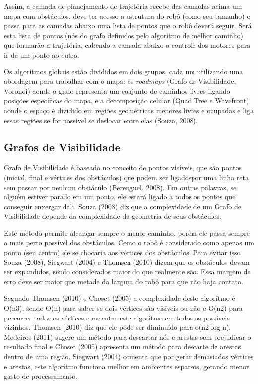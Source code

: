 Assim, a camada de planejamento de trajetória recebe das camadas acima um mapa com obstáculos, deve ter acesso a estrutura do robô (como seu tamanho) e passa para as camadas abaixo uma lista de pontos que o robô deverá seguir. Será esta lista de pontos (nós do grafo definidos pelo algoritmo de melhor caminho) que formarão a trajetória, cabendo a camada abaixo o controle dos motores para ir de um ponto ao outro.

Os algoritmos globais estão divididos em dois grupos, cada um utilizando uma abordagem para trabalhar com o mapa: os \textit{roadmaps} (Grafo de Visibilidade, Voronoi) aonde o grafo representa um conjunto de caminhos livres ligando posições específicas do mapa, e a decomposição celular (Quad Tree e Wavefront) aonde o espaço é dividido em regiões geométricas menores livres e ocupadas e liga essas regiões se for possível se deslocar entre elas (Souza, 2008).

\subsection{Grafos de Visibilidade}

Grafo de Visibilidade é baseado no conceito de pontos visíveis, que são pontos (inicial, final e vértices dos obstáculos) que podem ser ligadospor uma linha reta sem passar por nenhum obstáculo (Berenguel, 2008). Em outras palavras, se alguém estiver parado em um ponto, ele estará ligado a todos os pontos que conseguir enxergar dali. Souza (2008) diz que a complexidade de um Grafo de Visibilidade depende da complexidade da geometria de seus obstáculos.

Este método permite alcançar sempre o menor caminho, porém ele passa sempre o mais perto possível dos obstáculos. Como o robô é considerado como apenas um ponto (seu centro) ele se chocaria aos vértices dos obstáculos. Para evitar isso Souza (2008), Siegwart (2004) e Thomsen (2010) dizem que os obstáculos devam ser expandidos, sendo considerados maior do que realmente são. Essa margem de erro deve ser maior que metade da largura do robô para que não haja contato.

Segundo Thomsen (2010) e Choset (2005) a complexidade deste algorítmo é O(n3), sendo O(n) para saber se dois vértices são visíveis ou não e O(n2) para percorrer todos os vértices e executar este algoritmo em todos os possíveis vizinhos. Thomsen (2010) diz que ele pode ser diminuído para o(n2 log n). Medeiros (2011) sugere um método para descartar nós e arestas sem prejudicar o resultado final e Choset (2005) apresenta um método para descarte de arestas dentro de uma região. Siegwart (2004) comenta que por gerar demasiados vértices e arestas, este algorítmo funciona melhor em ambientes esparsos, gerando menor gasto de processamento.

